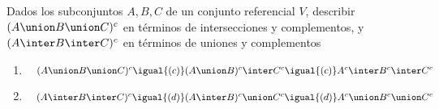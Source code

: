 \begin{enunciado}{\ejercicio}
  Dados los subconjuntos $A,B,C$ de un conjunto referencial $V$, describir $(A \union B \union C)^c$ en términos
  de intersecciones y complementos, y $(A \inter B \inter C)^c$ en términos de uniones y complementos
\end{enunciado}

\begin{enumerate}[label=\roman*)]
  \item $\quad (A \union B \union C)^c \igual{(c)} (A \union B)^c \inter C^c \igual{(c)} A^c \inter B^c \inter C^c$\Tilde
  \item $\quad (A \inter B \inter C)^c \igual{(d)} (A \inter B)^c \union C^c \igual{(d)} A^c \union B^c \union C^c$\Tilde
\end{enumerate}
